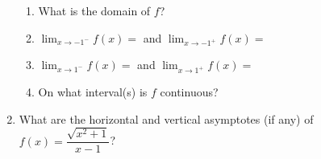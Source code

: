 \documentclass[12pt]{article}
\newcommand{\points}[1]{\marginpar{\hspace{24pt}[#1]}}
\newcommand{\di}{\displaystyle}
\begin{document}
\begin{enumerate}
\begin{enumerate}
 \item What is the domain of $f$?\points{1}

\bigskip

\bigskip

 \item $\di\lim_{x \to -1^-}f(x)= $ \underline{\hspace{1in}} and $\di \lim_{x\to -1^+}f(x)= $ \underline{\hspace{1in}}  \points{1}

\bigskip

\bigskip


 \item $\di \lim_{x \to 1^-}f(x)=$ \underline{\hspace{1in}} and $\di \lim_{x\to 1^+}f(x) =$ \underline{\hspace{1in}} \points{1}

\bigskip

\bigskip

 \item On what interval(s) is $f$ continuous? \points{1}
\end{enumerate}

\bigskip

\bigskip

\item What are the horizontal and vertical asymptotes (if any) of $f(x) = \dfrac{\sqrt{x^2+1}}{x-1}$?\points{2}
\end{enumerate}
\end{document}
